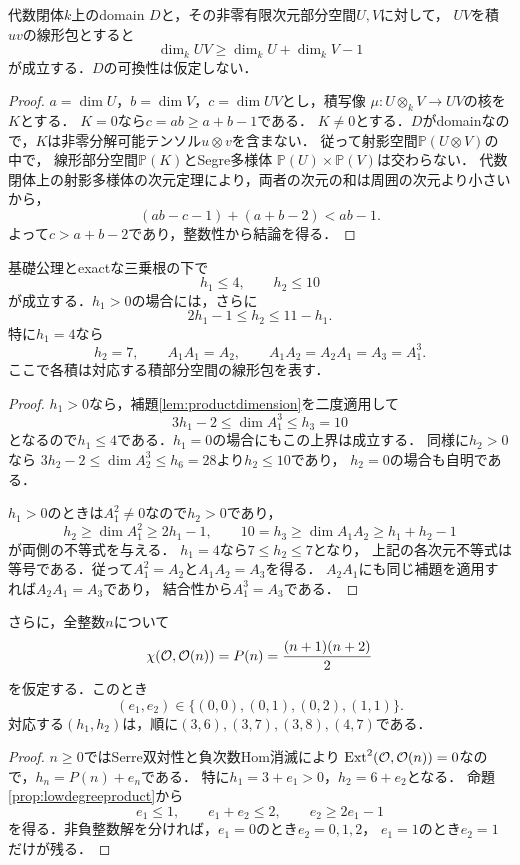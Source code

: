 \documentclass[11pt,a4paper]{ltjsarticle}
\begin{document}
\begin{lemma}[有限次元部分空間の積]\label{lem:productdimension}
代数閉体$k$上のdomain $D$と，その非零有限次元部分空間$U,V$に対して，
$UV$を積$uv$の線形包とすると
\[
 \dim_k UV\geq\dim_k U+\dim_k V-1
\]
が成立する．$D$の可換性は仮定しない．
\end{lemma}
\begin{proof}
$a=\dim U$，$b=\dim V$，$c=\dim UV$とし，積写像
$\mu:U\otimes_k V\to UV$の核を$K$とする．
$K=0$なら$c=ab\geq a+b-1$である．
$K\ne0$とする．$D$がdomainなので，$K$は非零分解可能テンソル$u\otimes v$を含まない．
従って射影空間$\mathbb P(U\otimes V)$の中で，
線形部分空間$\mathbb P(K)$とSegre多様体
$\mathbb P(U)\times\mathbb P(V)$は交わらない．
代数閉体上の射影多様体の次元定理により，両者の次元の和は周囲の次元より小さいから，
\[
 (ab-c-1)+(a+b-2)<ab-1.
\]
よって$c>a+b-2$であり，整数性から結論を得る．
\end{proof}

\begin{proposition}[低次数の無条件制約]\label{prop:lowdegreeproduct}
基礎公理とexactな三乗根の下で
\[
 h_1\leq4,\qquad h_2\leq10
\]
が成立する．$h_1>0$の場合には，さらに
\[
 2h_1-1\leq h_2\leq11-h_1.
\]
特に$h_1=4$なら
\[
 h_2=7,\qquad A_1A_1=A_2,\qquad
 A_1A_2=A_2A_1=A_3=A_1^3.
\]
ここで各積は対応する積部分空間の線形包を表す．
\end{proposition}
\begin{proof}
$h_1>0$なら，補題\ref{lem:productdimension}を二度適用して
\[
 3h_1-2\leq\dim A_1^3\leq h_3=10
\]
となるので$h_1\leq4$である．$h_1=0$の場合にもこの上界は成立する．
同様に$h_2>0$なら
$3h_2-2\leq\dim A_2^3\leq h_6=28$より$h_2\leq10$であり，
$h_2=0$の場合も自明である．

$h_1>0$のときは$A_1^2\ne0$なので$h_2>0$であり，
\[
 h_2\geq\dim A_1^2\geq2h_1-1,
 \qquad
 10=h_3\geq\dim A_1A_2\geq h_1+h_2-1
\]
が両側の不等式を与える．
$h_1=4$なら$7\leq h_2\leq7$となり，
上記の各次元不等式は等号である．従って$A_1^2=A_2$と$A_1A_2=A_3$を得る．
$A_2A_1$にも同じ補題を適用すれば$A_2A_1=A_3$であり，
結合性から$A_1^3=A_3$である．
\end{proof}

\begin{proposition}[Euler二次性の下で残る四候補]\label{prop:fourlowdegreecases}
さらに，全整数$n$について
\[
 \chi(\mathcal O,\mathcal O(n))=P(n)=\frac{(n+1)(n+2)}2
\]
を仮定する．このとき
\[
 (e_1,e_2)\in\{(0,0),(0,1),(0,2),(1,1)\}.
\]
対応する$(h_1,h_2)$は，順に$(3,6),(3,7),(3,8),(4,7)$である．
\end{proposition}
\begin{proof}
$n\geq0$ではSerre双対性と負次数Hom消滅により
$\operatorname{Ext}^2(\mathcal O,\mathcal O(n))=0$なので，$h_n=P(n)+e_n$である．
特に$h_1=3+e_1>0$，$h_2=6+e_2$となる．
命題\ref{prop:lowdegreeproduct}から
\[
 e_1\leq1,\qquad e_1+e_2\leq2,\qquad e_2\geq2e_1-1
\]
を得る．非負整数解を分ければ，$e_1=0$のとき$e_2=0,1,2$，
$e_1=1$のとき$e_2=1$だけが残る．
\end{proof}
\end{document}
